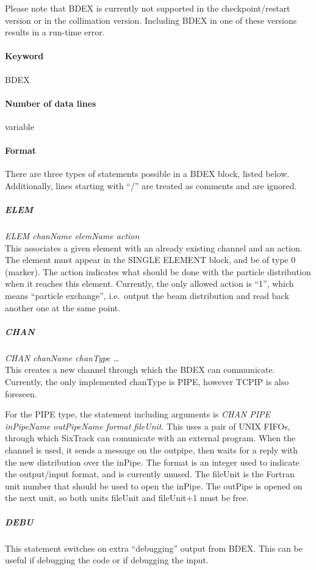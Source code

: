 Please note that BDEX is currently not supported in the checkpoint/restart version or in the collimation version.
Including BDEX in one of these versions results in a run-time error.

\paragraph{Keyword} BDEX

\paragraph{Number of data lines} variable

\paragraph{Format}
There are three types of statements possible in a BDEX block, listed below.
Additionally, lines starting with ``/'' are treated as comments and are ignored.

\subparagraph{ELEM} \emph{ELEM chanName elemName action}\\
This associates a given element with an already existing channel and an action.
The element must appear in the SINGLE ELEMENT block, and be of type 0 (marker).
The action indicates what should be done with the particle distribution when it reaches this element.
Currently, the only allowed action is ``1'', which means ``particle exchange'', i.e.\ output the beam distribution and read back another one at the same point.

\subparagraph{CHAN} \emph{CHAN chanName chanType \ldots}\\
This creates a new channel through which the BDEX can communicate.
Currently, the only implemented chanType is PIPE, however TCPIP is also foreseen.

For the PIPE type, the statement including arguments is \emph{CHAN PIPE inPipeName outPipeName format fileUnit}.
This uses a pair of UNIX FIFOs, through which SixTrack can comunicate with an external program.
When the channel is used, it sends a message on the outpipe, then waits for a reply with the new distribution over the inPipe.
The format is an integer used to indicate the output/input format, and is currently unused.
The fileUnit is the Fortran unit number that should be used to open the inPipe.
The outPipe is opened on the next unit, so both units fileUnit and fileUnit+1 must be free.

\subparagraph{DEBU}
This statement switches on extra ``debugging'' output from BDEX.
This can be useful if debugging the code or if debugging the input.

